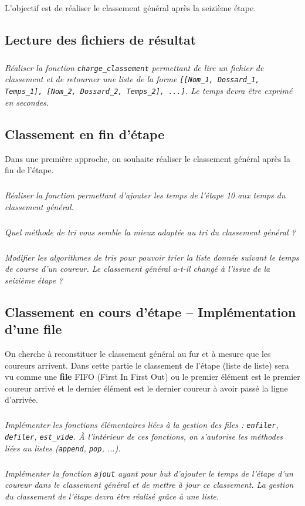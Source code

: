 \documentclass[10pt,fleqn]{article} %
\begin{document}
\begin{multicols}{2}
\begin{obj}
L'objectif est de réaliser le classement général après la seizième étape. 
\end{obj}

\subsection*{Lecture des fichiers de résultat}
\setcounter{exo}{0}
\subparagraph{}
\textit{Réaliser la fonction \texttt{charge\_classement} permettant de lire un fichier de classement 
et de retourner une liste de la forme \texttt{[[Nom\_1, Dossard\_1, Temps\_1], [Nom\_2, Dossard\_2, Temps\_2], ...]}. Le temps devra être exprimé en secondes.}



\subsection*{Classement en fin d'étape}
Dans une première approche, on souhaite réaliser le classement général après la fin de l'étape. 

\subparagraph{}
\textit{Réaliser la fonction permettant d'ajouter les temps de l'étape 10 aux temps du classement général.}

\subparagraph{}
\textit{Quel méthode de tri vous semble la mieux adaptée au tri du classement général ?}


\subparagraph{}
\textit{Modifier les algorithmes de tris pour pouvoir trier la liste donnée suivant le temps de course d'un coureur. Le classement général a-t-il changé à l'issue de la seizième étape ?}


\subsection*{Classement en cours d'étape -- Implémentation d'une file}
On cherche à reconstituer le classement général au fur et à mesure que les coureurs arrivent. Dans cette partie le classement de l'étape (liste de liste) sera vu comme une \textbf{file} FIFO (First In First Out) ou le premier élément est le premier coureur arrivé et le dernier élément est le dernier coureur à avoir passé la ligne d'arrivée.  

\subparagraph{}\textit{Implémenter les fonctions élémentaires liées à la gestion des files : \texttt{enfiler}, \texttt{defiler}, \texttt{est\_vide}. À l'intérieur de ces fonctions, on s'autorise les méthodes liées au listes (\texttt{append}, \texttt{pop}, ...).}


\subparagraph{}
\textit{Implémenter la fonction \texttt{ajout} ayant pour but d'ajouter le temps de l'étape d'un coureur dans le classement général et de mettre à jour ce classement. La gestion du classement de l'étape devra être réalisé grâce à une liste.}

\end{multicols}
\end{document}
